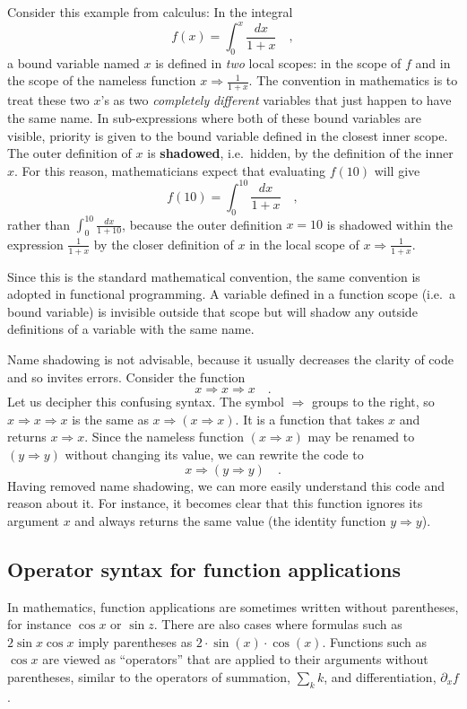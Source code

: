 Consider this example from calculus: In the integral
\[
f(x)=\int_{0}^{x}\frac{dx}{1+x}\quad,
\]
a bound variable named $x$ is defined in \emph{two} local scopes:
in the scope of $f$ and in the scope of the nameless function $x\Rightarrow\frac{1}{1+x}$.
The convention in mathematics is to treat these two $x$'s as two
\emph{completely} \emph{different} variables that just happen to have
the same name. In sub-expressions where both of these bound variables
are visible, priority is given to the bound variable defined in the
closest inner scope. The outer definition of $x$ is \textbf{shadowed},
i.e.\ hidden, by the definition of the inner $x$. For this reason,
mathematicians expect that evaluating $f(10)$ will give
\[
f(10)=\int_{0}^{10}\frac{dx}{1+x}\quad,
\]
rather than $\int_{0}^{10}\frac{dx}{1+10}$, because the outer definition
$x=10$ is shadowed within the expression $\frac{1}{1+x}$ by the
closer definition of $x$ in the local scope of $x\Rightarrow\frac{1}{1+x}$.

Since this is the standard mathematical convention, the same convention
is adopted in functional programming. A variable defined in a function
scope (i.e.\ a bound variable) is invisible outside that scope but
will shadow any outside definitions of a variable with the same name.

Name shadowing is not advisable, because it
usually decreases the clarity of code and so invites errors. Consider
the function
\[
x\Rightarrow x\Rightarrow x\quad.
\]
Let us decipher this confusing syntax. The symbol $\Rightarrow$ groups
to the right, so $x\Rightarrow x\Rightarrow x$ is the same as $x\Rightarrow\left(x\Rightarrow x\right)$.
It is a function that takes $x$ and returns $x\Rightarrow x$. Since
the nameless function $\left(x\Rightarrow x\right)$ may be renamed
to $\left(y\Rightarrow y\right)$ without changing its value, we can
rewrite the code to
\[
x\Rightarrow\left(y\Rightarrow y\right)\quad.
\]
Having removed name shadowing, we can more easily understand this
code and reason about it. For instance, it becomes clear that this
function ignores its argument $x$ and always returns the same value
(the identity function $y\Rightarrow y$).

\subsection{Operator syntax for function applications}

In mathematics, function applications are sometimes written without
parentheses, for instance $\cos x$ or $\sin z$. There are also cases
where formulas such as $2\sin x\cos x$ imply parentheses as $2\cdot\sin\left(x\right)\cdot\cos\left(x\right)$.
Functions such as $\cos x$ are viewed as ``operators'' that are
applied to their arguments without parentheses, similar to the operators
of summation, $\sum_{k}k$, and differentiation, $\partial_{x}f$.

